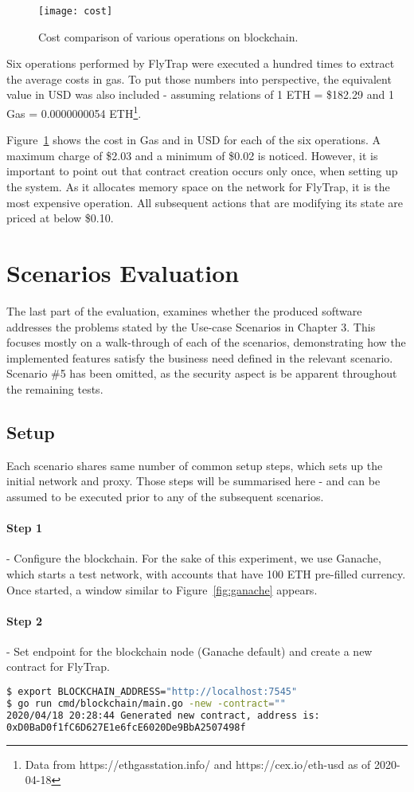 \begin{figure}[h]
    \centering
    \texttt{[image: cost]}
    \caption{Cost comparison of various operations on blockchain.}
    \label{fig:cost}
\end{figure}

Six operations performed by FlyTrap were executed a hundred times to extract the average costs in gas. To put those numbers into perspective, the equivalent value in USD was also included - assuming relations of 1 ETH = \$182.29 and 1 Gas = 0.0000000054 ETH\footnote{Data from https://ethgasstation.info/ and https://cex.io/eth-usd as of 2020-04-18}.

Figure~\ref{fig:cost} shows the cost in Gas and in USD for each of the six operations. A maximum charge of \$2.03 and a minimum of \$0.02 is noticed. However, it is important to point out that contract creation occurs only once, when setting up the system. As it allocates memory space on the network for FlyTrap, it is the most expensive operation. All subsequent actions that are modifying its state are priced at below \$0.10.


\section{Scenarios Evaluation}
The last part of the evaluation, examines whether the produced software addresses the problems stated by the Use-case Scenarios in Chapter 3. This focuses mostly on a walk-through of each of the scenarios, demonstrating how the implemented features satisfy the business need defined in the relevant scenario. Scenario \#5 has been omitted, as the security aspect is be apparent throughout the remaining tests.
\subsection{Setup}
Each scenario shares same number of common setup steps, which sets up the initial network and proxy. Those steps will be summarised here - and can be assumed to be executed prior to any of the subsequent scenarios.
\paragraph{Step 1} - Configure the blockchain. For the sake of this experiment, we use Ganache, which starts a test network, with accounts that have 100 ETH pre-filled currency. Once started, a window similar to Figure~\ref{fig:ganache} appears.
\paragraph{Step 2} - Set endpoint for the blockchain node (Ganache default) and create a new contract for FlyTrap.
\begin{lstlisting}[language=bash]
$ export BLOCKCHAIN_ADDRESS="http://localhost:7545"
$ go run cmd/blockchain/main.go -new -contract=""
2020/04/18 20:28:44 Generated new contract, address is:
0xD0BaD0f1fC6D627E1e6fcE6020De9BbA2507498f
\end{lstlisting}
